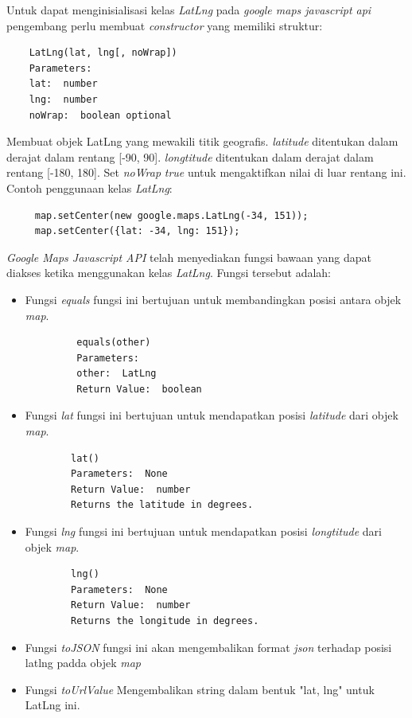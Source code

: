Untuk dapat menginisialisasi kelas \textit{LatLng} pada \textit{google maps javascript api} pengembang perlu membuat \textit{constructor} yang memiliki struktur:
\begin{lstlisting}
    LatLng(lat, lng[, noWrap])
    Parameters: 
    lat:  number
    lng:  number
    noWrap:  boolean optional
\end{lstlisting}
Membuat objek LatLng yang mewakili titik geografis. \textit{latitude} ditentukan dalam derajat dalam rentang [-90, 90]. \textit{longtitude} ditentukan dalam derajat dalam rentang [-180, 180]. Set \textit{noWrap} \textit{true}  untuk mengaktifkan nilai di luar rentang ini. Contoh penggunaan kelas \textit{LatLng}:
\begin{lstlisting}
     map.setCenter(new google.maps.LatLng(-34, 151));
     map.setCenter({lat: -34, lng: 151}); 
\end{lstlisting}
\textit{Google Maps Javascript API} telah menyediakan fungsi bawaan yang dapat diakses ketika menggunakan kelas \textit{LatLng}. Fungsi tersebut adalah:
\begin{itemize}
    \item Fungsi \textit{equals} fungsi ini bertujuan untuk membandingkan posisi antara objek \textit{map}.
    \begin{lstlisting}
         equals(other)
         Parameters: 
         other:  LatLng
         Return Value:  boolean
    \end{lstlisting}
    \item Fungsi \textit{lat} fungsi ini bertujuan untuk mendapatkan posisi \textit{latitude} dari  objek \textit{map}.
    \begin{lstlisting}
        lat()
        Parameters:  None
        Return Value:  number
        Returns the latitude in degrees.
    \end{lstlisting}
    \item Fungsi \textit{lng} fungsi ini bertujuan untuk mendapatkan posisi \textit{longtitude} dari  objek \textit{map}.
    \begin{lstlisting}
        lng()
        Parameters:  None
        Return Value:  number
        Returns the longitude in degrees.
    \end{lstlisting}
    \item Fungsi \textit{toJSON} fungsi ini akan mengembalikan format \textit{json} terhadap posisi latlng padda objek \textit{map}
    \item Fungsi \textit{toUrlValue} Mengembalikan string dalam bentuk "lat, lng" untuk LatLng ini.
\end{itemize}


